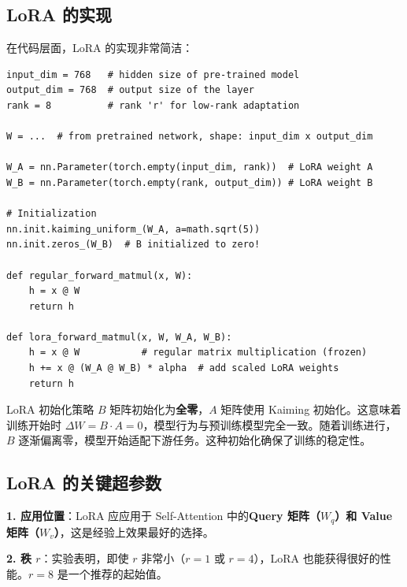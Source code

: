 \documentclass[a4paper]{article}
\begin{document}
\subsection{LoRA 的实现}

在代码层面，LoRA 的实现非常简洁：





\begin{lstlisting}[caption={LoRA 的 PyTorch 实现}]
input_dim = 768   # hidden size of pre-trained model
output_dim = 768  # output size of the layer
rank = 8          # rank 'r' for low-rank adaptation

W = ...  # from pretrained network, shape: input_dim x output_dim

W_A = nn.Parameter(torch.empty(input_dim, rank))  # LoRA weight A
W_B = nn.Parameter(torch.empty(rank, output_dim)) # LoRA weight B

# Initialization
nn.init.kaiming_uniform_(W_A, a=math.sqrt(5))
nn.init.zeros_(W_B)  # B initialized to zero!

def regular_forward_matmul(x, W):
    h = x @ W
    return h

def lora_forward_matmul(x, W, W_A, W_B):
    h = x @ W           # regular matrix multiplication (frozen)
    h += x @ (W_A @ W_B) * alpha  # add scaled LoRA weights
    return h
\end{lstlisting}

\begin{knowledgebox}{LoRA 初始化策略}
$B$ 矩阵初始化为\textbf{全零}，$A$ 矩阵使用 Kaiming 初始化。这意味着训练开始时 $\Delta W = B \cdot A = 0$，模型行为与预训练模型完全一致。随着训练进行，$B$ 逐渐偏离零，模型开始适配下游任务。这种初始化确保了训练的稳定性。
\end{knowledgebox}

\subsection{LoRA 的关键超参数}





\textbf{1. 应用位置}：LoRA 应应用于 Self-Attention 中的\textbf{Query 矩阵（$W_q$）和 Value 矩阵（$W_v$）}，这是经验上效果最好的选择。





\textbf{2. 秩 $r$}：实验表明，即使 $r$ 非常小（$r = 1$ 或 $r = 4$），LoRA 也能获得很好的性能。$r = 8$ 是一个推荐的起始值。
\end{document}
